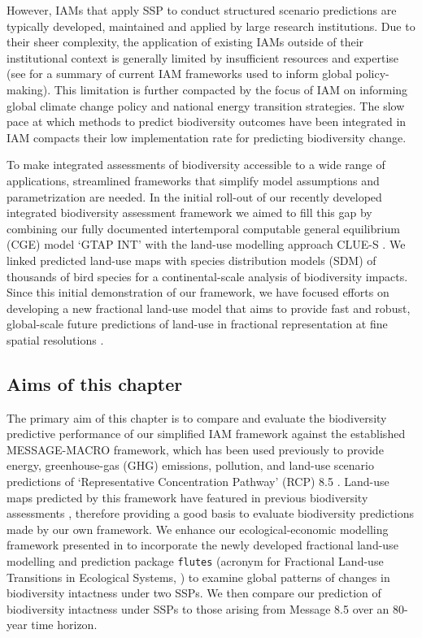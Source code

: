 \documentclass[titlesmallcaps,copyrightpage]{uomthesis}\usepackage[]{graphicx}\usepackage[]{color}
\begin{document}
However, IAMs that apply SSP to conduct structured scenario predictions are typically developed, maintained and applied by large research institutions. Due to their sheer complexity, the application of existing IAMs outside of their institutional context is generally limited by insufficient resources and expertise (see  for a summary of current IAM frameworks used to inform global policy-making). This limitation is further compacted by the focus of IAM on informing global climate change policy and national energy transition strategies. The slow pace at which methods to predict biodiversity outcomes have been integrated in IAM compacts their low implementation rate for predicting biodiversity change.

To make integrated assessments of biodiversity accessible to a wide range of applications, streamlined frameworks that simplify model assumptions and parametrization are needed. In the initial roll-out of our recently developed integrated biodiversity assessment framework we aimed to fill this gap by combining our fully documented intertemporal computable general equilibrium (CGE) model `GTAP INT' \citep{van_ha_building_2017} with the land-use modelling approach CLUE-S \citep{verburg_modeling_2002}. We linked predicted land-use maps with species distribution models (SDM) of thousands of bird species for a continental-scale analysis of biodiversity impacts. Since this initial demonstration of our framework, we have focused efforts on developing a new fractional land-use model that aims to provide fast and robust, global-scale future predictions of land-use in fractional representation at fine spatial resolutions \citep[,][]{kapitza_predictive_2020}.

\subsection{Aims of this chapter}

The primary aim of this chapter is to compare and evaluate the biodiversity predictive performance of our simplified IAM framework against the established MESSAGE-MACRO framework, which has been used previously to provide energy, greenhouse-gas (GHG) emissions, pollution, and land-use scenario predictions of `Representative Concentration Pathway' (RCP) 8.5 \citep[hereafter referred to as Message 8.5,][]{riahi_shared_2017}. Land-use maps predicted by this framework have featured in previous biodiversity assessments \citep{newbold_global_2015}, therefore providing a good basis to evaluate biodiversity predictions made by our own framework. We enhance our ecological-economic modelling framework presented in  to incorporate the newly developed fractional land-use modelling and prediction package \texttt{flutes} (acronym for Fractional Land-use Transitions in Ecological Systems, ) to examine global patterns of changes in biodiversity intactness under two SSPs. We then compare our prediction of biodiversity intactness under SSPs to those arising from Message 8.5 over an 80-year time horizon.
\end{document}
